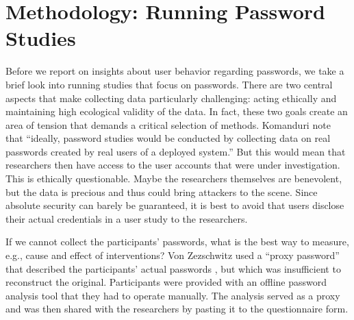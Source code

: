 






\section{Methodology: Running Password Studies}
Before we report on insights about user behavior regarding passwords, we take a brief look into running studies that focus on passwords. There are two central aspects that make collecting data particularly challenging: acting ethically and maintaining high ecological validity of the data. In fact, these two goals create an area of tension that demands a critical selection of methods. Komanduri \etal note that ``ideally, password studies would be conducted by collecting data on real passwords created by real users of a deployed system.'' \cite{Komanduri2011OfPasswordsAndPeople} But this would mean that researchers then have access to the user accounts that were under investigation. This is ethically questionable. Maybe the researchers themselves are benevolent, but the data is precious and thus could bring attackers to the scene. Since absolute security can barely be guaranteed, it is best to avoid that users disclose their actual credentials in a user study to the researchers. 

If we cannot collect the participants' passwords, what is the best way to measure, e.g., cause and effect of interventions? Von Zezschwitz \etal used a ``proxy password'' that described the participants' actual passwords \cite{VonZezschwitz2013SurvivalShortest}, but which was insufficient to reconstruct the original. Participants were provided with an offline password analysis tool that they had to operate manually. The analysis served as a proxy and was then shared with the researchers by pasting it to the questionnaire form. 

